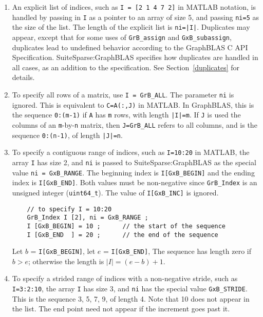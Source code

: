 \documentclass[12pt]{article}
\begin{document}
\begin{enumerate}
\item
    An explicit list of indices, such as \verb'I = [2 1 4 7 2]' in MATLAB
    notation, is handled by passing in \verb'I' as a pointer to an array of
    size 5, and passing \verb'ni=5' as the size of the list.
    The length of the explicit list is \verb'ni=|I|'.
    Duplicates may appear, except that for some uses of \verb'GrB_assign'
    and \verb'GxB_subassign', duplicates lead to undefined behavior
    according to the GraphBLAS C API Specification.
    SuiteSparse:GraphBLAS specifies how duplicates are handled in all cases,
    as an addition to the specification.
    See Section~\ref{duplicates} for details.

\item To specify all rows of a matrix, use \verb'I = GrB_ALL'.  The
    parameter \verb'ni' is ignored.  This is equivalent to \verb'C=A(:,J)'
    in MATLAB.  In GraphBLAS, this is the sequence \verb'0:(m-1)' if \verb'A'
    has \verb'm' rows, with length \verb'|I|=m'.  If \verb'J' is used the
    columns of an \verb'm'-by-\verb'n' matrix, then \verb'J=GrB_ALL' refers to
    all columns, and is the sequence \verb'0:(n-1)', of length \verb'|J|=n'.

\item To specify a contiguous range of indices, such as \verb'I=10:20'
    in MATLAB, the array \verb'I' has size 2, and \verb'ni' is passed to
    SuiteSparse:GraphBLAS as the special value \verb'ni = GxB_RANGE'.  The
    beginning index is \verb'I[GxB_BEGIN]' and the ending index is
    \verb'I[GxB_END]'.   Both values must be non-negative since
    \verb'GrB_Index' is an unsigned integer (\verb'uint64_t').  The value of
    \verb'I[GxB_INC]' is ignored.

    \vspace{-0.05in}
    {\footnotesize
    \begin{verbatim}
    // to specify I = 10:20
    GrB_Index I [2], ni = GxB_RANGE ;
    I [GxB_BEGIN] = 10 ;      // the start of the sequence
    I [GxB_END  ] = 20 ;      // the end of the sequence \end{verbatim}}

    \vspace{-0.05in}
    Let $b$ = \verb'I[GxB_BEGIN]', let $e$ = \verb'I[GxB_END]',
    The sequence has length zero if $b > e$; otherwise the length is
    $|I| = (e-b) + 1$.

\item To specify a strided range of indices with a non-negative stride,
    such as \verb'I=3:2:10', the array \verb'I' has size 3, and \verb'ni' has
    the special value \verb'GxB_STRIDE'.  This is the sequence 3, 5, 7, 9, of
    length 4.  Note that 10 does not appear in the list.  The end point need
    not appear if the increment goes past it.


\end{enumerate}
\end{document}
